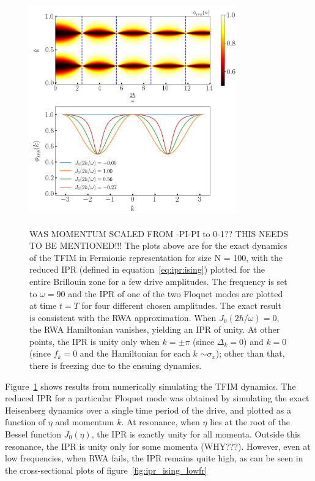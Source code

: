 \documentclass[%
 reprint,
superscriptaddress,
 amsmath,amssymb,
 aps,
prb,
]{revtex4-2}
\begin{document}
\begin{figure}[hbt!]
	\centering
	\includegraphics[height = 10cm, width = 9.0cm]{ising_exact_ipr.jpeg}
	\caption{ WAS MOMENTUM SCALED FROM -PI-PI to 0-1?? THIS NEEDS TO BE MENTIONED!!!
		The plots above are for the exact dynamics of the TFIM in Fermionic representation for size N = 100, with the reduced IPR (defined in equation~\ref{eq:ipr:ising}) plotted for the entire Brillouin zone for a few drive amplitudes. The frequency is set to $\omega = 90$ and the IPR of one of the two Floquet modes are plotted at time $t=T$ for four different chosen amplitudes. The exact result is consistent with the RWA approximation. When $J_0(2h/\omega) = 0$, the RWA Hamiltonian vanishes, yielding an IPR of unity. At other points, the IPR is unity only when $k=\pm \pi$ (since $\Delta_k=0$) and $k=0$ (since $f_k = 0$ and the Hamiltonian for each $k$ $\sim \sigma_x$); other than that, there is freezing due to the ensuing dynamics.}
	\label{fig:ipr:tfim}
\end{figure}
Figure~\ref{fig:ipr:tfim} shows results from numerically simulating the TFIM dynamics. The reduced IPR for a particular Floquet mode was obtained by simulating the exact Heisenberg dynamics over a single time period of the drive, and plotted as a function of $\eta$ and momentum $k$. At resonance, when $\eta$ lies at the root of the Bessel function $J_0(\eta)$,  the IPR is exactly unity for all momenta. Outside this resonance, the IPR is unity only for some momenta (WHY???). However, even at low frequencies, when RWA fails, the IPR remains quite high, as can be seen in the cross-sectional plots of figure~\ref{fig:ipr_ising_lowfr}
\end{document}
